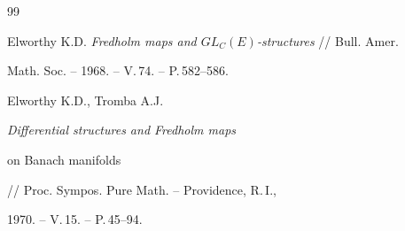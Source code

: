 \begin{thebibliography}{99}


Elworthy K.D. {\em Fredholm maps and $GL_C(E)$-structures} // Bull. Amer.


Math. Soc. -- 1968. -- V.\,74. -- P.\,582--586.




Elworthy K.D., Tromba A.J. {\em Differential structures and Fredholm maps


on Banach manifolds} // Proc. Sympos. Pure Math. -- Providence, R.\,I.,


1970. -- V.\,15. -- P.\,45--94.





\end{thebibliography}





\vskip 2cm















